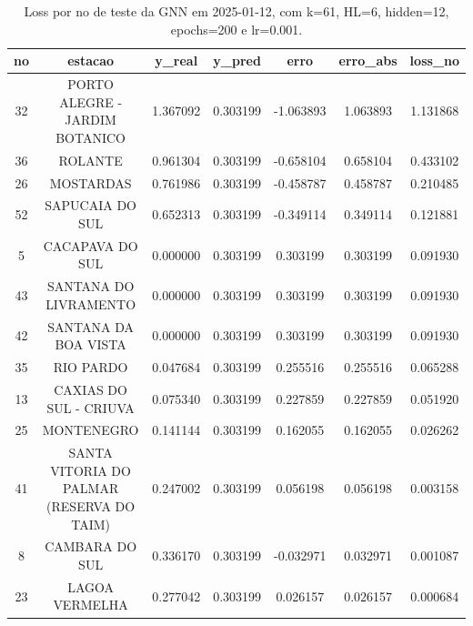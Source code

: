 \begin{table}[h]
\centering
\caption{Loss por no de teste da GNN em 2025-01-12, com k=61, HL=6, hidden=12, epochs=200 e lr=0.001.}
\label{tab:gnn_loss_k61_hl6_h12_e200_d20250112}
\begin{tabular}{ccccccc}
\toprule
no & estacao & y\_real & y\_pred & erro & erro\_abs & loss\_no \\
\midrule
32 & PORTO ALEGRE - JARDIM BOTANICO & 1.367092 & 0.303199 & -1.063893 & 1.063893 & 1.131868 \\
36 & ROLANTE & 0.961304 & 0.303199 & -0.658104 & 0.658104 & 0.433102 \\
26 & MOSTARDAS & 0.761986 & 0.303199 & -0.458787 & 0.458787 & 0.210485 \\
52 & SAPUCAIA DO SUL & 0.652313 & 0.303199 & -0.349114 & 0.349114 & 0.121881 \\
5 & CACAPAVA DO SUL & 0.000000 & 0.303199 & 0.303199 & 0.303199 & 0.091930 \\
43 & SANTANA DO LIVRAMENTO & 0.000000 & 0.303199 & 0.303199 & 0.303199 & 0.091930 \\
42 & SANTANA DA BOA VISTA & 0.000000 & 0.303199 & 0.303199 & 0.303199 & 0.091930 \\
35 & RIO PARDO & 0.047684 & 0.303199 & 0.255516 & 0.255516 & 0.065288 \\
13 & CAXIAS DO SUL - CRIUVA & 0.075340 & 0.303199 & 0.227859 & 0.227859 & 0.051920 \\
25 & MONTENEGRO & 0.141144 & 0.303199 & 0.162055 & 0.162055 & 0.026262 \\
41 & SANTA VITORIA DO PALMAR (RESERVA DO TAIM) & 0.247002 & 0.303199 & 0.056198 & 0.056198 & 0.003158 \\
8 & CAMBARA DO SUL & 0.336170 & 0.303199 & -0.032971 & 0.032971 & 0.001087 \\
23 & LAGOA VERMELHA & 0.277042 & 0.303199 & 0.026157 & 0.026157 & 0.000684 \\
\bottomrule
\end{tabular}
\end{table}
